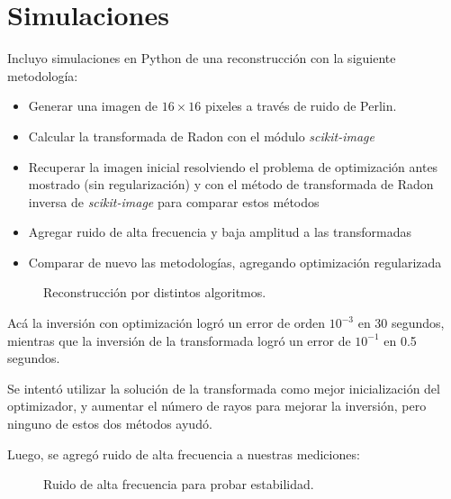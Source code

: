 \section{Simulaciones}
Incluyo simulaciones en Python de una reconstrucción con la siguiente metodología:
\begin{itemize}
    \item Generar una imagen de $16\times 16$ pixeles a través de ruido de Perlin.
    \item Calcular la transformada de Radon con el módulo \textit{scikit-image} \citep{scikit-image}
    \item Recuperar la imagen inicial resolviendo el problema de optimización antes mostrado (sin regularización) y con el método de transformada de Radon inversa de \textit{scikit-image} para comparar estos métodos
    \item Agregar ruido de alta frecuencia y baja amplitud a las transformadas
    \item Comparar de nuevo las metodologías, agregando optimización regularizada
\end{itemize}
\begin{figure}\centering
{}\hfill 
{}
\label{fig}
\end{figure}
\begin{figure}\centering
{}\hfill
{}
\caption{Reconstrucción por distintos algoritmos.}
\label{fig}
\end{figure}

Acá la inversión con optimización logró un error de orden $10^{-3}$ en 30 segundos, mientras que la inversión de la transformada logró un error de $10^{-1}$ en 0.5 segundos.

Se intentó utilizar la solución de la transformada como mejor inicialización del optimizador, y aumentar el número de rayos para mejorar la inversión, pero ninguno de estos dos métodos ayudó.

Luego, se agregó ruido de alta frecuencia a nuestras mediciones:
\begin{figure}\centering
{}\hfill
{}
\caption{Ruido de alta frecuencia para probar estabilidad.}
\label{fig}
\end{figure}

